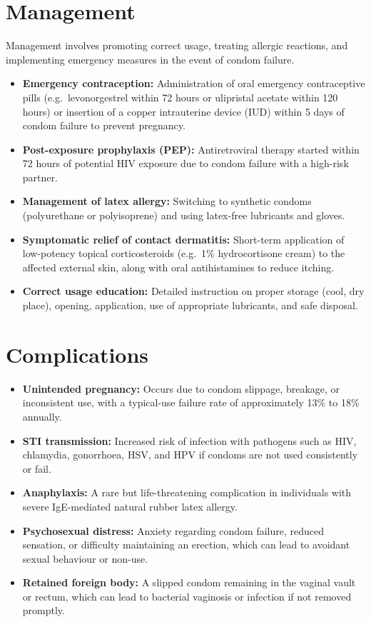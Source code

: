 \section*{Management}
Management involves promoting correct usage, treating allergic reactions, and implementing emergency measures in the event of condom failure.
\begin{itemize}
    \item \textbf{Emergency contraception:} Administration of oral emergency contraceptive pills (e.g.\ levonorgestrel within 72 hours or ulipristal acetate within 120 hours) or insertion of a copper intrauterine device (IUD) within 5 days of condom failure to prevent pregnancy.
    \item \textbf{Post-exposure prophylaxis (PEP):} Antiretroviral therapy started within 72 hours of potential HIV exposure due to condom failure with a high-risk partner.
    \item \textbf{Management of latex allergy:} Switching to synthetic condoms (polyurethane or polyisoprene) and using latex-free lubricants and gloves.
    \item \textbf{Symptomatic relief of contact dermatitis:} Short-term application of low-potency topical corticosteroids (e.g.\ 1\% hydrocortisone cream) to the affected external skin, along with oral antihistamines to reduce itching.
    \item \textbf{Correct usage education:} Detailed instruction on proper storage (cool, dry place), opening, application, use of appropriate lubricants, and safe disposal.
\end{itemize}

\section*{Complications}
\begin{itemize}
    \item \textbf{Unintended pregnancy:} Occurs due to condom slippage, breakage, or inconsistent use, with a typical-use failure rate of approximately 13\% to 18\% annually.
    \item \textbf{STI transmission:} Increased risk of infection with pathogens such as HIV, chlamydia, gonorrhoea, HSV, and HPV if condoms are not used consistently or fail.
    \item \textbf{Anaphylaxis:} A rare but life-threatening complication in individuals with severe IgE-mediated natural rubber latex allergy.
    \item \textbf{Psychosexual distress:} Anxiety regarding condom failure, reduced sensation, or difficulty maintaining an erection, which can lead to avoidant sexual behaviour or non-use.
    \item \textbf{Retained foreign body:} A slipped condom remaining in the vaginal vault or rectum, which can lead to bacterial vaginosis or infection if not removed promptly.
\end{itemize}

